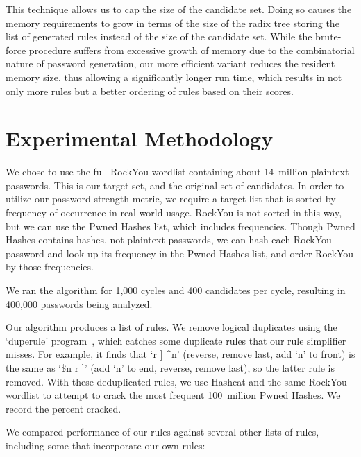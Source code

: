 \documentclass[letterpaper,twocolumn,10pt]{article}
\begin{document}
This technique allows us to cap the size of the candidate set. Doing so causes
the memory requirements to grow in terms of the size of the radix tree storing
the list of generated rules instead of the size of the candidate set. While the
brute-force procedure suffers from excessive growth of memory due to the
combinatorial nature of password generation, our more efficient variant reduces
the resident memory size, thus allowing a significantly longer run time, which
results in not only more rules but a better ordering of rules based on their
scores.

\section{Experimental Methodology}
\label{sec:methodology}

We chose to use the full RockYou wordlist containing about 14~million plaintext
passwords. This is our target set, and the original set of candidates. In order
to utilize our password strength metric, we require a target list that is
sorted by frequency of occurrence in real-world usage. RockYou is not sorted in
this way, but we can use the Pwned Hashes list, which includes frequencies.
Though Pwned Hashes contains hashes, not plaintext passwords, we can hash each
RockYou password and look up its frequency in the Pwned Hashes list, and order
RockYou by those frequencies.

We ran the algorithm for 1,000 cycles and 400 candidates per cycle, resulting
in 400,000 passwords being analyzed.

Our algorithm produces a list of rules. We remove logical duplicates using the
`duperule' program~\cite{duprule}, which catches some duplicate rules that our
rule simplifier misses. For example, it finds that `r ] \^{}n' (reverse, remove
last, add `n' to front) is the same as `\$n r ]' (add `n' to end, reverse,
remove last), so the latter rule is removed. With these deduplicated rules, we
use Hashcat and the same RockYou wordlist to attempt to crack the most frequent
100~million Pwned Hashes. We record the percent cracked.

We compared performance of our rules against several other lists of rules,
including some that incorporate our own rules:
\end{document}
